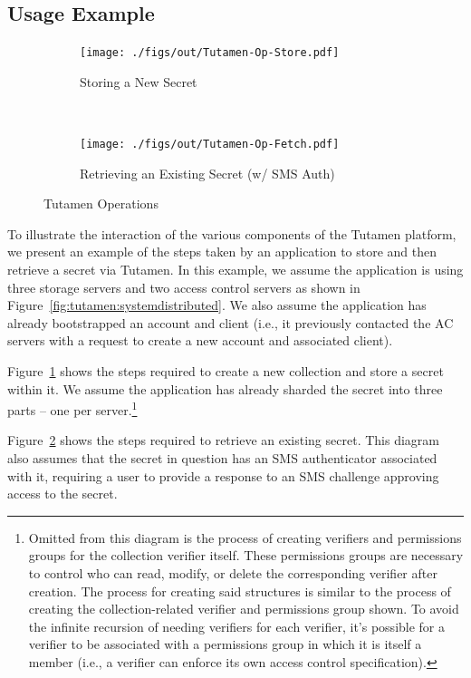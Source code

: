 \subsection{Usage Example}

\begin{figure}[!t]
  \centering
  \begin{subfigure}[t]{0.48\textwidth}
    \texttt{[image: ./figs/out/Tutamen-Op-Store.pdf]}
    \caption{Storing a New Secret}
    \label{fig:tutamen:ops:store}
  \end{subfigure}
  ~
  \begin{subfigure}[t]{0.48\textwidth}
    \texttt{[image: ./figs/out/Tutamen-Op-Fetch.pdf]}
    \caption{Retrieving an Existing Secret (w/ SMS Auth)}
    \label{fig:tutamen:ops:fetch}
  \end{subfigure}
  \caption{Tutamen Operations}
  \label{fig:tutamen:ops}
\end{figure}

To illustrate the interaction of the various components of the Tutamen
platform, we present an example of the steps taken by an application
to store and then retrieve a secret via Tutamen. In this example, we
assume the application is using three storage servers and two access
control servers as shown in
Figure~\ref{fig:tutamen:systemdistributed}. We also assume the
application has already bootstrapped an account and client (i.e., it
previously contacted the AC servers with a request to create a new
account and associated client).

Figure~\ref{fig:tutamen:ops:store} shows the steps required to
create a new collection and store a secret within it. We assume the
application has already sharded the secret into three parts -- one per
server.\footnote{Omitted from this diagram is the process of creating
  verifiers and permissions groups for the collection verifier
  itself. These permissions groups are necessary to control who can
  read, modify, or delete the corresponding verifier after
  creation. The process for creating said structures is similar to the
  process of creating the collection-related verifier and permissions
  group shown. To avoid the infinite recursion of needing verifiers
  for each verifier, it's possible for a verifier to be associated
  with a permissions group in which it is itself a member (i.e., a
  verifier can enforce its own access control specification).}

Figure~\ref{fig:tutamen:ops:fetch} shows the steps required to
retrieve an existing secret. This diagram also assumes that the secret
in question has an SMS authenticator associated with it, requiring a
user to provide a response to an SMS challenge approving access to the
secret.


